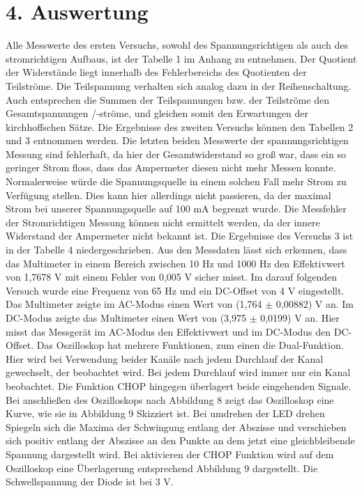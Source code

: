 \documentclass[11pt]{article}
\begin{document}
\section*{4. Auswertung}
Alle Messwerte des ersten Versuchs, sowohl des Spannungsrichtigen als auch des stromrichtigen Aufbaus, ist der Tabelle 1 im Anhang zu entnehmen. Der Quotient der Widerstände liegt innerhalb des Fehlerbereichs des Quotienten der Teilströme. Die Teilspannung verhalten sich analog dazu in der Reihenschaltung. Auch entsprechen die Summen der Teilspannungen bzw. der Teilströme den Gesamtspannungen /-ströme, und gleichen somit den Erwartungen der kirchhoffschen Sätze. Die Ergebnisse des zweiten Versuchs können den Tabellen 2 und 3 entnommen werden. Die letzten beiden Messwerte der spannungsrichtigen Messung sind fehlerhaft, da hier der Gesamtwiderstand so groß war, dass ein so geringer Strom floss, dass das Ampermeter diesen nicht mehr Messen konnte. Normalerweise würde die Spannungsquelle in einem solchen Fall mehr Strom zu Verfügung stellen. Dies kann hier allerdings nicht passieren, da der maximal Strom bei unserer Spannungsquelle auf 100 mA begrenzt wurde. Die Messfehler der Stromrichtigen Messung können nicht ermittelt werden, da der innere Widerstand der Ampermeter nicht bekannt ist. Die Ergebnisse des Versuchs 3 ist in der Tabelle 4 niedergeschrieben. Aus den Messdaten lässt sich erkennen, dass das Multimeter in einem Bereich zwischen 10 Hz und 1000 Hz den Effektivwert von 1,7678 V mit einem Fehler von 0,005 V sicher misst. Im darauf folgenden Versuch wurde eine Frequenz von 65 Hz und ein DC-Offset von 4 V eingestellt. Das Multimeter zeigte im AC-Modus einen Wert von (1,764 $\pm$ 0,00882) V an. Im DC-Modus zeigte das Multimeter einen Wert von (3,975 $\pm$ 0,0199) V an. Hier misst das Messgerät im AC-Modus den Effektivwert und im DC-Modus den DC-Offset. Das Oszilloskop hat mehrere Funktionen, zum einen die Dual-Funktion. Hier wird bei Verwendung beider Kanäle nach jedem Durchlauf der Kanal gewechselt, der beobachtet wird. Bei jedem Durchlauf wird immer nur ein Kanal beobachtet. Die Funktion CHOP hingegen überlagert beide eingehenden Signale. Bei anschließen des Oszilloskops nach Abbildung 8 zeigt das Oszilloskop eine Kurve, wie sie in Abbildung 9 Skizziert ist. Bei umdrehen der LED drehen Spiegeln sich die Maxima der Schwingung entlang der Abszisse und verschieben sich positiv entlang der Abszisse an den Punkte an dem jetzt eine gleichbleibende Spannung dargestellt wird. Bei aktivieren der CHOP Funktion wird auf dem Oszilloskop eine Überlagerung entsprechend Abbildung 9 dargestellt. Die Schwellspannung der Diode ist bei 3 V.
\end{document}

